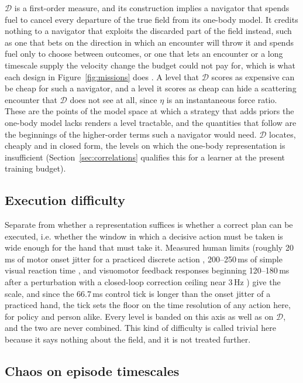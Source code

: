 \documentclass[11pt]{article}
\newcommand{\dd}{\mathcal{D}}
\begin{document}
$\dd$ is a first-order measure, and its construction implies a navigator
that spends fuel to cancel every departure of the true field from its
one-body model. It credits nothing to a navigator that exploits the
discarded part of the field instead, such as one that bets on the direction
in which an encounter will throw it and spends fuel only to choose between
outcomes, or one that lets an encounter or a long timescale supply the
velocity change the budget could not pay for, which is what each design in
Figure~\ref{fig:missions} does \cite{belbruno1993,koon2000}. A
level that $\dd$ scores as expensive can be cheap for such a navigator, and
a level it scores as cheap can hide a scattering encounter that $\dd$ does
not see at all, since $\eta$ is an instantaneous force ratio. These are the
points of the model space at which a strategy that adds priors the one-body
model lacks renders a level tractable, and the quantities that follow are
the beginnings of the higher-order terms such a navigator would need. $\dd$ locates, cheaply and in closed form, the levels on which the one-body
representation is insufficient (Section~\ref{sec:correlations} qualifies
this for a learner at the present training budget).

\subsection{Execution difficulty}
\label{sec:trivial}

Separate from whether a representation suffices is whether a correct plan
can be executed, i.e. whether the window in which a decisive action must be
taken is wide enough for the hand that must take it. Measured human limits
(roughly 20\,ms of motor onset jitter for a practiced discrete action
\cite{repp2005}, 200--250\,ms of simple visual reaction time
\cite{woods2015}, and visuomotor feedback responses beginning 120--180\,ms
after a perturbation with a closed-loop correction ceiling near 3\,Hz
\cite{franklin2011,franklin2014}) give the scale, and since the 66.7\,ms
control tick is longer than the onset jitter of a practiced hand, the tick
sets the floor on the time resolution of any action here, for policy and
person alike. Every level is banded on this axis as well as on $\dd$, and the
two are never combined. This kind of difficulty is called trivial here
because it says nothing about the field, and it is not treated further.

\subsection{Chaos on episode timescales}
\label{sec:chaos}
\end{document}
